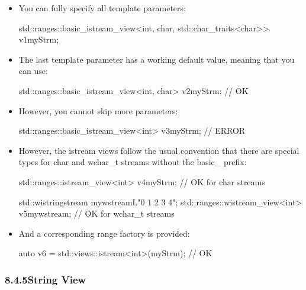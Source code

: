 \begin{itemize}
\item
You can fully specify all template parameters:

\begin{cpp}
std::ranges::basic_istream_view<int, char, std::char_traits<char>> v1{myStrm};
\end{cpp}

\item
The last template parameter has a working default value, meaning that you can use:

\begin{cpp}
std::ranges::basic_istream_view<int, char> v2{myStrm}; // OK
\end{cpp}

\item
However, you cannot skip more parameters:

\begin{cpp}
std::ranges::basic_istream_view<int> v3{myStrm}; // ERROR
\end{cpp}

\item
However, the istream views follow the usual convention that there are special types for char and wchar\_t streams without the basic\_ prefix:

\begin{cpp}
std::ranges::istream_view<int> v4{myStrm}; // OK for char streams

std::wistringstream mywstream{L"0 1 2 3 4"};
std::ranges::wistream_view<int> v5{mywstream}; // OK for wchar_t streams
\end{cpp}

\item
And a corresponding range factory is provided:

\begin{cpp}
auto v6 = std::views::istream<int>(myStrm); // OK
\end{cpp}
\end{itemize}

\subsubsection*{ 8.4.5\hspace{0.2cm}String View}

